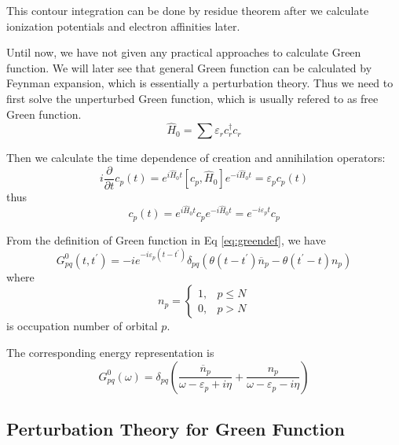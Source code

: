 This contour integration can be done by residue theorem after we calculate ionization potentials and electron affinities later.

Until now, we have not given any practical approaches to calculate Green function.
We will later see that general Green function can be calculated by Feynman expansion, which is essentially a perturbation theory.
Thus we need to first solve the unperturbed Green function, which is usually refered to as free Green function.
\begin{equation}
\hat{H}_{0}=\sum \varepsilon_{r} c_{r}^{\dagger} c_{r}
\end{equation}

Then we calculate the time dependence of creation and annihilation operators:
\begin{equation}
i \frac{\partial}{\partial t} c_{p}(t)=e^{i \hat{H}_{0} t}\left[c_{p}, \hat{H}_{0}\right] e^{-i \hat{H}_{0} t}=\varepsilon_{p} c_{p}(t)
\end{equation}
thus
\begin{equation}
c_{p}(t)=e^{i \hat{H}_{0} t} c_{p} e^{-i \hat{H}_{0} t}=e^{-i \varepsilon_{p} t} c_{p}
\end{equation}

From the definition of Green function in Eq \ref{eq:greendef}, we have 
\begin{equation}
G_{p q}^{0}\left(t, t^{\prime}\right)=-i e^{-i \varepsilon_{p}\left(t-t^{\prime}\right)} \delta_{p q}\left(\theta\left(t-t^{\prime}\right) \overline{n}_{p}-\theta\left(t^{\prime}-t\right) n_{p}\right)
\end{equation}
where
\begin{equation}
n_{p}=
\left\{
\begin{array}{ll}
	{1,} & {p \leq N}
	\\
	{0,} & {p>N}
\end{array}
\right.
\end{equation}
is occupation number of orbital $p$.

The corresponding energy representation is
\begin{equation}
G_{p q}^{0}(\omega)=\delta_{p q}\left(\frac{\overline{n}_{p}}{\omega-\varepsilon_{p}+i \eta}+\frac{n_{p}}{\omega-\varepsilon_{p}-i \eta}\right)
\end{equation}

\subsection{Perturbation Theory for Green Function}

